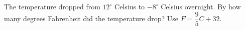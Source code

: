 The temperature dropped from $12^\circ$ Celsius to $-8^\circ$ Celsius overnight. By how many degrees Fahrenheit did the temperature drop? Use $F=\dfrac{9}{5}C+32$.
